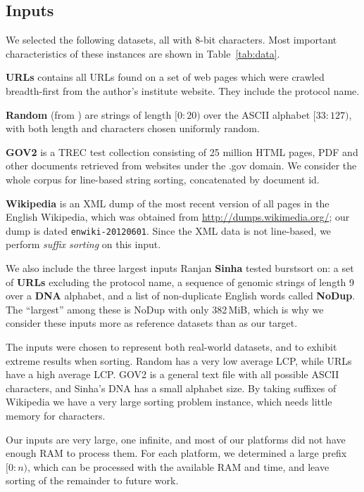 \documentclass[a4paper]{myjournal}
\begin{document}
\subsection{Inputs}\label{sec:exp-inputs}

We selected the following datasets, all with 8-bit characters. Most important
characteristics of these instances are shown in Table~\ref{tab:data}.

\textbf{URLs} contains all URLs found on a set of web pages which were crawled
breadth-first from the author's institute website. They include the protocol
name.

\textbf{Random} (from \cite{sinha2004cache-conscious}) are strings of length
$[0 \mathop{:} 20)$ over the ASCII alphabet $[33 \mathop{:} 127)$, with both length and characters
chosen uniformly random.

\textbf{GOV2} is a TREC test collection consisting of 25 million HTML pages, PDF
and other documents retrieved from websites under the .gov domain. We
consider the whole corpus for line-based string sorting, concatenated by
document id.

\textbf{Wikipedia} is an XML dump of the most recent version of all pages in the
English Wikipedia, which was obtained from \url{http://dumps.wikimedia.org/};
our dump is dated \texttt{enwiki-20120601}.  Since the XML data is not
line-based, we perform \emph{suffix sorting} on this input.

We also include the three largest inputs Ranjan \textbf{Sinha}
\cite{sinha2004cache-conscious} tested burstsort on: a set of \textbf{URLs}
excluding the protocol name, a sequence of genomic strings of length 9 over a
\textbf{DNA} alphabet, and a list of non-duplicate English words called
\textbf{NoDup}. The ``largest'' among these is NoDup with only 382\,MiB, which
is why we consider these inputs more as reference datasets than as our target.

The inputs were chosen to represent both real-world datasets, and to exhibit
extreme results when sorting. Random has a very low average LCP, while URLs have
a high average LCP. GOV2 is a general text file with all possible ASCII
characters, and Sinha's DNA has a small alphabet size. By taking suffixes of
Wikipedia we have a very large sorting problem instance, which needs little
memory for characters.

Our inputs are very large, one infinite, and most of our platforms did not have
enough RAM to process them. For each platform, we determined a large prefix
$[0 \mathop{:} n)$, which can be processed with the available RAM and time, and leave
sorting of the remainder to future work.
\end{document}
